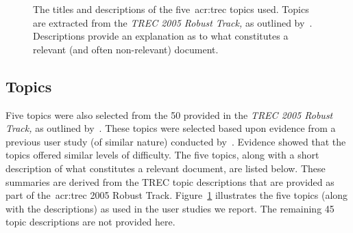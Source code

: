 \begin{figure}[t!]
    \centering
    \caption[TREC topic titles and descriptions]{The titles and descriptions of the five~\gls{acr:trec} topics used. Topics are extracted from the \emph{TREC 2005 Robust Track,} as outlined by~\cite{voorhees2006trec_robust}. Descriptions provide an explanation as to what constitutes a relevant (and often non-relevant) document.}
    \label{fig:topics}
\end{figure}

\subsection{Topics}\label{sec:methodology:collection:topics}
Five topics were also selected from the 50 provided in the \emph{TREC 2005 Robust Track,} as outlined by~\cite{voorhees2006trec_robust}. These topics were selected based upon evidence from a previous user study (of similar nature) conducted by~\cite{kelly2009user_study}. Evidence showed that the topics offered similar levels of difficulty. The five topics, along with a short description of what constitutes a relevant document, are listed below. These summaries are derived from the TREC topic descriptions that are provided as part of the~\gls{acr:trec} 2005 Robust Track. Figure~\ref{fig:topics} illustrates the five topics (along with the descriptions) as used in the user studies we report. The remaining 45 topic descriptions are not provided here.

